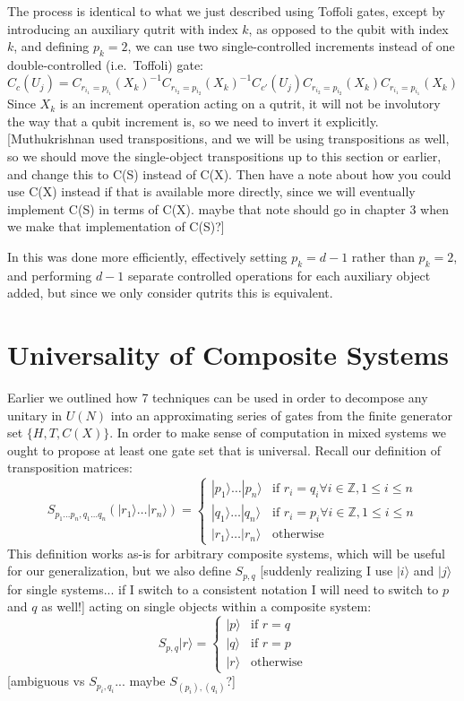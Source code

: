 \documentclass[]{article}
\newcommand{\ket}[1]{| #1 \rangle}
\begin{document}
The process is identical to what we just described using Toffoli gates, except by introducing an auxiliary qutrit with index $k$, as opposed to the qubit with index $k$, and defining $p_k = 2$, we can use two single-controlled increments instead of one double-controlled (i.e.\ Toffoli) gate:
\[
C_c(U_j) = C_{r_{i_1}=p_{i_1}}(X_k)^{-1}
C_{r_{i_2}=p_{i_2}}(X_k)^{-1}
C_{c'}(U_j)
C_{r_{i_2}=p_{i_2}}(X_k)
C_{r_{i_1}=p_{i_1}}(X_k)
\]
Since $X_k$ is an increment operation acting on a qutrit, it will not be involutory the way that a qubit increment is, so we need to invert it explicitly. [Muthukrishnan used transpositions, and we will be using transpositions as well, so we should move the single-object transpositions up to this section or earlier, and change this to C(S) instead of C(X). Then have a note about how you could use C(X) instead if that is available more directly, since we will eventually implement C(S) in terms of C(X). maybe that note should go in chapter 3 when we make that implementation of C(S)?]

In \cite{multi-valued-logic} this was done more efficiently, effectively setting $p_k = d-1$ rather than $p_k = 2$, and performing $d-1$ separate controlled operations for each auxiliary object added, but since we only consider qutrits this is equivalent.
\section{Universality of Composite Systems}
Earlier we outlined how 7 techniques can be used in order to decompose any unitary in $U(N)$ into an approximating series of gates from the finite generator set $\{H, T, C(X)\}$. In order to make sense of computation in mixed systems we ought to propose at least one gate set that is universal. Recall our definition of transposition matrices:
\[S_{p_1\dots p_n, q_1\dots q_n}(\ket{r_1}\dots\ket{r_n}) = \begin{cases}
	\ket{p_1}\dots\ket{p_n} & \text{if\ } r_i = q_i \forall i \in \mathbb{Z}, 1 \leq i \leq n \\
	\ket{q_1}\dots\ket{q_n} & \text{if\ } r_i = p_i \forall i \in \mathbb{Z}, 1 \leq i \leq n \\
	\ket{r_1}\dots\ket{r_n} & \text{otherwise}
\end{cases}
\]
This definition works as-is for arbitrary composite systems, which will be useful for our generalization, but we also define $S_{p,q}$ [suddenly realizing I use $\ket{i}$ and $\ket{j}$ for single systems... if I switch to a consistent notation I will need to switch to $p$ and $q$ as well!] acting on single objects within a composite system:
\[S_{p, q}\ket{r} =
\begin{cases}
	\ket{p} & \text{if\ } r = q \\
	\ket{q} & \text{if\ } r = p \\
	\ket{r} & \text{otherwise}
\end{cases}
\]
[ambiguous vs $S_{p_i, q_i}$... maybe $S_{(p_i),(q_i)}$?]
\end{document}
